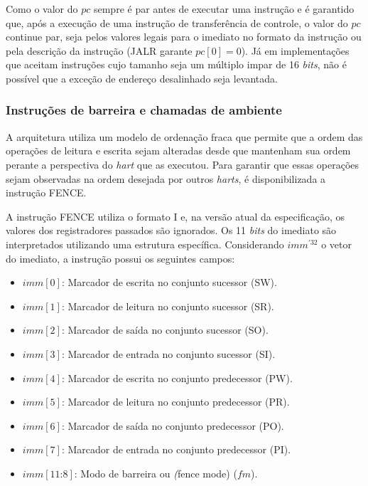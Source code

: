   Como o valor do $pc$ sempre é par antes de executar uma instrução e é garantido que, após a execução 
  de uma instrução de transferência de controle, o valor do $pc$ continue par, 
  seja pelos valores legais para o imediato no formato da 
  instrução ou pela descrição da instrução (JALR garante $pc[0] = 0$). Já em implementações que aceitam 
  instruções cujo tamanho seja um múltiplo impar de 16 \emph{bits}, não é possível que a exceção de 
  endereço desalinhado seja levantada.

\subsubsection{Instruções de barreira e chamadas de ambiente}
\label{ssec:fs32}

  A arquitetura utiliza um modelo de ordenação fraca que permite que a ordem das operações de leitura e escrita
  sejam alteradas desde que mantenham sua ordem perante a perspectiva do \emph{hart} que as executou.
  Para garantir que essas operações sejam observadas na ordem desejada por outros \emph{harts},
  é disponibilizada a instrução FENCE.

  A instrução FENCE utiliza o formato I e, na versão atual da especificação,
  os valores dos registradores passados são ignorados.
  Os 11 \emph{bits} do imediato são interpretados utilizando uma estrutura específica. 
  Considerando $imm^{'32}$ o vetor do imediato, a instrução possui os seguintes campos:

  \begin{itemize}
    \item $imm[0]$: Marcador de escrita no conjunto sucessor (SW).
    \item $imm[1]$: Marcador de leitura no conjunto sucessor (SR).
    \item $imm[2]$: Marcador de saída no conjunto sucessor (SO).
    \item $imm[3]$: Marcador de entrada no conjunto sucessor (SI).
    \item $imm[4]$: Marcador de escrita no conjunto predecessor (PW).
    \item $imm[5]$: Marcador de leitura no conjunto predecessor (PR).
    \item $imm[6]$: Marcador de saída no conjunto predecessor (PO).
    \item $imm[7]$: Marcador de entrada no conjunto predecessor (PI).
    \item $imm[11\text{:}8]$: Modo de barreira ou \emph(fence mode) ($f\!m$).
  \end{itemize}

